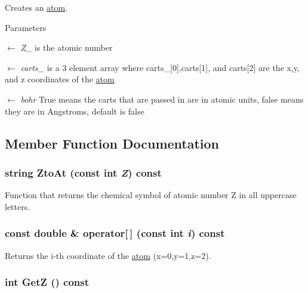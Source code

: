 Creates an \hyperlink{classJKBuilder_1_1atom}{atom}. 
\begin{DoxyParams}{Parameters}
\item[\mbox{$\leftarrow$} {\em Z\_\-}]is the atomic number \item[\mbox{$\leftarrow$} {\em carts\_\-}]is a 3 element array where carts\_\-\mbox{[}0\mbox{]},carts\mbox{[}1\mbox{]}, and carts\mbox{[}2\mbox{]} are the x,y, and z coordinates of the \hyperlink{classJKBuilder_1_1atom}{atom} \item[\mbox{$\leftarrow$} {\em bohr}]True means the carts that are passed in are in atomic units, false means they are in Angstroms, default is false \end{DoxyParams}


\subsection{Member Function Documentation}
\hypertarget{classJKBuilder_1_1atom_a163d1d4c84461da513e1d1346cb1b407}{
\subsubsection[{ZtoAt}]{\setlength{\rightskip}{0pt plus 5cm}string ZtoAt (const int {\em Z}) const}}
\label{classJKBuilder_1_1atom_a163d1d4c84461da513e1d1346cb1b407}


Function that returns the chemical symbol of atomic number Z in all uppercase letters. \hypertarget{classJKBuilder_1_1atom_a4f0dc1b84b580cec49500c70f87e084a}{
\subsubsection[{operator[]}]{\setlength{\rightskip}{0pt plus 5cm}const double \& operator\mbox{[}$\,$\mbox{]} (const int {\em i}) const}}
\label{classJKBuilder_1_1atom_a4f0dc1b84b580cec49500c70f87e084a}


Returns the i-\/th coordinate of the \hyperlink{classJKBuilder_1_1atom}{atom} (x=0,y=1,z=2). \hypertarget{classJKBuilder_1_1atom_a57becd9a69927a5ba8ae251a7790dc2a}{
\subsubsection[{GetZ}]{\setlength{\rightskip}{0pt plus 5cm}int GetZ () const}}
\label{classJKBuilder_1_1atom_a57becd9a69927a5ba8ae251a7790dc2a}


